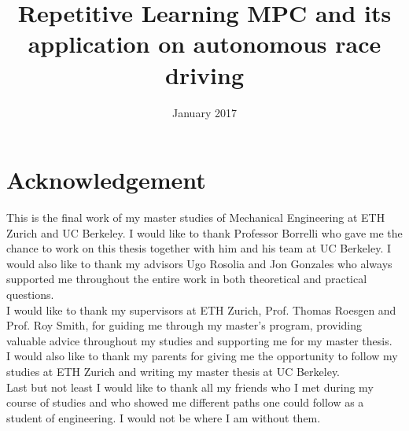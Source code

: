 \documentclass[10pt,twoside,a4paper,fleqn]{report}
\title{Repetitive Learning MPC and its application on autonomous race driving}
\date{January 2017}
\begin{document}
\maketitle 							%

\setcounter{tocdepth}{2}
\tableofcontents
 \cleardoublepage

\chapter*{Acknowledgement}
This is the final work of my master studies of Mechanical Engineering at ETH Zurich and UC Berkeley. I would like to thank Professor Borrelli who gave me the chance to work on this thesis together with him and his team at UC Berkeley. I would also like to thank my advisors Ugo Rosolia and Jon Gonzales who always supported me throughout the entire work in both theoretical and practical questions.\\
I would like to thank my supervisors at ETH Zurich, Prof. Thomas Roesgen and Prof. Roy Smith, for guiding me through my master's program, providing valuable advice throughout my studies and supporting me for my master thesis.\\
I would also like to thank my parents for giving me the opportunity to follow my studies at ETH Zurich and writing my master thesis at UC Berkeley.\\
Last but not least I would like to thank all my friends who I met during my course of studies and who showed me different paths one could follow as a student of engineering. I would not be where I am without them.
 \cleardoublepage
 
\end{document}
